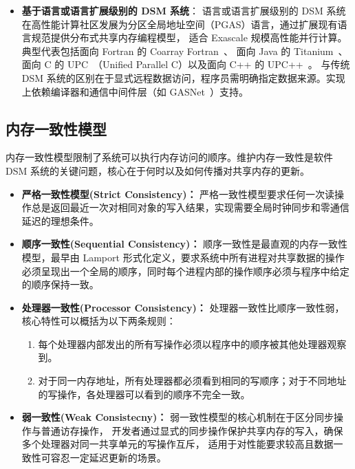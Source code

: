 {\begin{itemize}
        \item \textbf{基于语言或语言扩展级别的 DSM 系统}：
              语言或语言扩展级别的 DSM 系统在高性能计算社区发展为分区全局地址空间（PGAS）语言，通过扩展现有语言规范提供分布式共享内存编程模型，
              适合 Exascale 规模高性能并行计算。典型代表包括面向 Fortran 的 Coarray Fortran~\citep{numrich1998coarrayfortran, coarryfortran2}、
              面向 Java 的 Titanium~\citep{Yelick1998Titanium}、
              面向 C 的 UPC~\citep{bonachea2013UPC}（Unified Parallel C）以及面向 C++ 的 UPC++~\citep{bachan2019upc++}。
              与传统 DSM 系统的区别在于显式远程数据访问，程序员需明确指定数据来源。实现上依赖编译器和通信中间件层（如 GASNet~\citep{Bonachea2018GASNetEX}）支持。
    \end{itemize}

    \subsection{内存一致性模型}
    内存一致性模型限制了系统可以执行内存访问的顺序。维护内存一致性是软件 DSM 系统的关键问题，核心在于何时以及如何传播对共享内存的更新。

    \begin{itemize}
        \item \textbf{严格一致性模型(Strict Consistency)：} 严格一致性模型要求任何一次读操作总是返回最近一次对相同对象的写入结果，实现需要全局时钟同步和零通信延迟的理想条件。

        \item \textbf{顺序一致性(Sequential Consistency)：} 顺序一致性是最直观的内存一致性模型，最早由 Lamport 形式化定义，要求系统中所有进程对共享数据的操作必须呈现出一个全局的顺序，同时每个进程内部的操作顺序必须与程序中给定的顺序保持一致。

        \item \textbf{处理器一致性(Processor Consistency)：} 处理器一致性比顺序一致性弱，核心特性可以概括为以下两条规则：
              \begin{enumerate}[label=\arabic*.]
                  \item 每个处理器内部发出的所有写操作必须以程序中的顺序被其他处理器观察到。
                  \item 对于同一内存地址，所有处理器都必须看到相同的写顺序；对于不同地址的写操作，各处理器可以看到的顺序不完全一致。
              \end{enumerate}

        \item \textbf{弱一致性(Weak Consistecny)：} 弱一致性模型的核心机制在于区分同步操作与普通访存操作，
              开发者通过显式的同步操作保护共享内存的写入，确保多个处理器对同一共享单元的写操作互斥，
              适用于对性能要求较高且数据一致性可容忍一定延迟更新的场景。


\end{itemize}}
